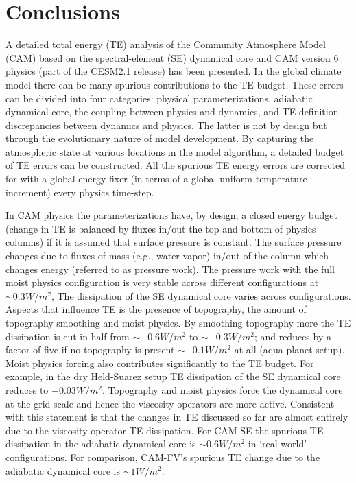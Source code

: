 \documentclass{agujournal}
\begin{document}
\section{Conclusions}\label{sec:concl}
A detailed total energy (TE) analysis of the Community Atmosphere Model (CAM) based on the spectral-element (SE) dynamical core and CAM version 6 physics (part of the CESM2.1 release) has been presented. In the global climate model there can be many spurious contributions to the TE budget. These errors can be divided into four categories: physical parameterizations, adiabatic dynamical core, the coupling between physics and dynamics, and TE definition discrepancies between dynamics and physics. The latter is not by design but through the evolutionary nature of model development. By capturing the atmospheric state at various locations in the model algorithm, a detailed budget of TE errors can be constructed. All the spurious TE energy errors are corrected for with a global energy fixer (in terms of a global uniform temperature increment) every physics time-step.

In CAM physics the parameterizations have, by design, a closed energy budget (change in TE is balanced by fluxes in/out the top and bottom of physics columns) if it is assumed that surface pressure is constant. The surface pressure changes due to fluxes of mass (e.g., water vapor) in/out of the column which changes energy (referred to as pressure work). The pressure work with the full moist physics configuration is very stable across different configurations at $\sim 0.3W/m^2$, The dissipation of the SE dynamical core varies across configurations. Aspects that influence TE is the presence of topography, the amount of topography smoothing and moist physics. By smoothing topography more the TE dissipation is cut in half from $\sim -0.6W/m^2$ to $\sim -0.3W/m^2$; and reduces by a factor of five if no topography is present $\sim -0.1W/m^2$ at all (aqua-planet setup). Moist physics forcing also contributes significantly to the TE budget. For example, in the dry Held-Suarez setup TE dissipation of the SE dynamical core reduces to $-0.03W/m^2$. Topography and moist physics force the dynamical core at the grid scale and hence the viscosity operators are more active. Consistent with this statement is that the changes in TE discussed so far are almost entirely due to the viscosity operator TE dissipation. For CAM-SE the spurious TE dissipation in the adiabatic dynamical core is $\sim 0.6W/m^2$ in `real-world' configurations. For comparison, CAM-FV's spurious TE change due to the adiabatic dynamical core is $\sim 1W/m^2$. 
\end{document}
